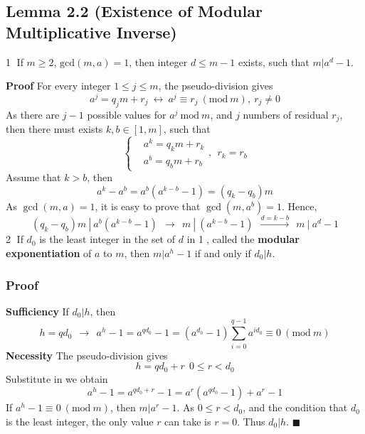 \documentclass[11pt]{article}
\begin{document}
\subsection{Lemma 2.2 (Existence of Modular Multiplicative Inverse)}
\noindent \textcircled{1} If $m \geq 2$, $\text{gcd}(m,a) = 1$, then integer $d \leq m-1$ exists, such that $m|a^d-1$. \par \noindent
\textbf{Proof} For every integer $1 \leq j \leq m$, the pseudo-division gives
\begin{equation}
    a^j = q_jm+r_j~\leftrightarrow~a^j \equiv r_j~(\text{mod}~m),~r_j \neq 0
\end{equation}
As there are $j-1$ possible values for $a^j~\text{mod}~m$, and $j$ numbers of residual $r_j$, then there must exists $k,b \in [1, m]$, such that
\begin{equation}
\left\{
\begin{aligned}
    &a^k = q_km+r_k \\ &a^b = q_bm+r_b 
\end{aligned}
\right. ,~~r_k = r_b
\end{equation}
Assume that $k > b$, then
\begin{equation}
    a^k - a^b = a^b(a^{k-b}-1) = (q_k-q_b)m
\end{equation}
As $\gcd(m,a) = 1$, it is easy to prove that $\gcd(m, a^b) = 1$. Hence,
\begin{equation}
    (q_k-q_b)m~|~a^b(a^{k-b}-1)~~\rightarrow~~m~|~(a^{k-b}-1)~~\xrightarrow{d = k-b}~~m~|~a^d-1
\end{equation}
\textcircled{2} If $d_0$ is the least integer in the set of $d$ in \textcircled{1}, called the \textbf{modular exponentiation} of $a$ to $m$, then $m|a^h-1$ if and only if $d_0|h$. \par \noindent 
\subsubsection*{Proof}
\noindent \textbf{Sufficiency} If $d_0|h$, then
\begin{equation}
    h = qd_0~~\rightarrow~~a^h-1 = a^{qd_0} - 1 = (a^{d_0}-1)\sum_{i=0}^{q-1}a^{id_0} \equiv 0~ (\text{mod}~m)
\end{equation}
\textbf{Necessity} The pseudo-division gives
\begin{equation}
    h = qd_0 + r~~0 \leq r < d_0
\end{equation}
Substitute in we obtain
\begin{equation}
    a^h-1 = a^{qd_0 + r} - 1 = a^r(a^{qd_0} - 1) + a^r - 1
\end{equation}
If $a^h-1 \equiv 0~(\text{mod}~m)$, then $m|a^r-1$. As $0 \leq r < d_0$, and the condition that $d_0$ is the least integer, the only value $r$ can take is $r=0$. Thus $d_0 | h$. \hfill $\blacksquare$
\end{document}

